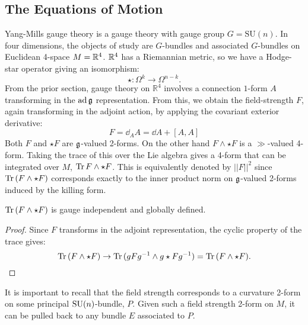 \subsection{The Equations of Motion} %
\label{sub:the_equations_of_motion}

Yang-Mills gauge theory is a gauge theory with gauge group $G = \mathrm{SU}(n)$. In four dimensions, the objects of study are $G$-bundles and associated $G$-bundles on Euclidean 4-space $M = \mathbb{R}^4$. $\mathbb{R}^4$ has a Riemannian metric, so we have a Hodge-star operator giving an isomorphism:
\[
	\star: \Omega^k \to \Omega^{n-k}.
\]
From the prior section, gauge theory on $\mathbb R^4$ involves a connection $1$-form $A$ transforming in the $\mathrm{ad}\,\frak{g}$ representation. From this, we obtain the field-strength $F$, again transforming in the adjoint action, by applying the covariant exterior derivative:
\begin{equation}
	F = \dd_A A = \dd A + [A, A]
\end{equation}
Both $F$ and $\star F$ are $\frak g$-valued 2-forms. On the other hand $F \wedge \star F$ is a $\gg$-valued 4-form. Taking the trace of this over the Lie algebra gives a 4-form that can be integrated over $M$, $\mathrm{Tr}\, F \wedge \star F$. This is equivalently denoted by $||F||^2$ since $\mathrm{Tr}\, (F \wedge \star  F)$ corresponds exactly to the inner product norm on $\frak g$-valued 2-forms induced by the killing form.

\begin{prop}
	$\mathrm{Tr}\,(F \wedge \star F)$ is gauge independent and globally defined.
\end{prop}
\begin{proof}
	Since $F$ transforms in the adjoint representation, the cyclic property of the trace gives:
	\[
		\mathrm{Tr}\,(F \wedge \star F) \to \mathrm{Tr}\,(g F g^{-1} \wedge g \star F g^{-1}) = \mathrm{Tr}\,(F \wedge \star F).
	\]
\end{proof}
It is important to recall that the field strength corresponds to a curvature 2-form on some principal $\mathrm{SU}(n)$-bundle, $P$. Given such a field strength 2-form on $M$, it can be pulled back to any bundle $E$ associated to $P$. 


